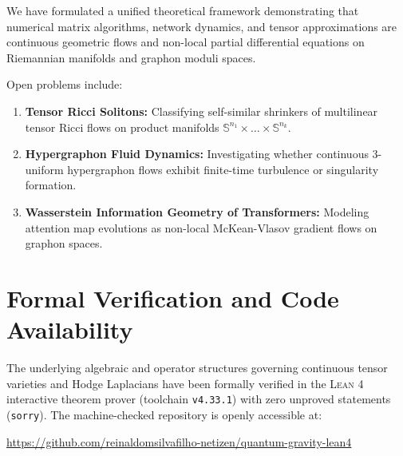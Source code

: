 \documentclass[11pt,a4paper,reqno]{amsart}
\theoremstyle{definition}
\numberwithin{equation}{section}
\newcommand{\Sph}{\mathbb{S}}
\begin{document}
We have formulated a unified theoretical framework demonstrating that numerical matrix algorithms, network dynamics, and tensor approximations are continuous geometric flows and non-local partial differential equations on Riemannian manifolds and graphon moduli spaces. 

Open problems include:
\begin{enumerate}
    \item \textbf{Tensor Ricci Solitons:} Classifying self-similar shrinkers of multilinear tensor Ricci flows on product manifolds $\Sph^{n_1} \times \dots \times \Sph^{n_k}$.
    \item \textbf{Hypergraphon Fluid Dynamics:} Investigating whether continuous 3-uniform hypergraphon flows exhibit finite-time turbulence or singularity formation.
    \item \textbf{Wasserstein Information Geometry of Transformers:} Modeling attention map evolutions as non-local McKean-Vlasov gradient flows on graphon spaces.
\end{enumerate}

\section*{Formal Verification and Code Availability}
The underlying algebraic and operator structures governing continuous tensor varieties and Hodge Laplacians have been formally verified in the \textsc{Lean 4} interactive theorem prover (toolchain \texttt{v4.33.1}) with zero unproved statements (\texttt{sorry}). The machine-checked repository is openly accessible at:
\begin{center}
\url{https://github.com/reinaldomsilvafilho-netizen/quantum-gravity-lean4}
\end{center}
\end{document}
